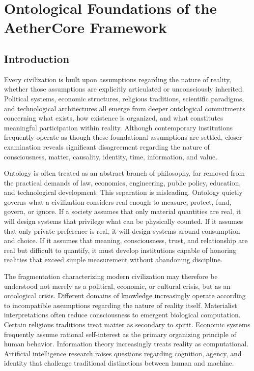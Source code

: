 \documentclass[12pt]{article}
\begin{document}
\section{Ontological Foundations of the AetherCore Framework}

\subsection{Introduction}

Every civilization is built upon assumptions regarding the nature of reality, whether those assumptions are explicitly articulated or unconsciously inherited. Political systems, economic structures, religious traditions, scientific paradigms, and technological architectures all emerge from deeper ontological commitments concerning what exists, how existence is organized, and what constitutes meaningful participation within reality. Although contemporary institutions frequently operate as though these foundational assumptions are settled, closer examination reveals significant disagreement regarding the nature of consciousness, matter, causality, identity, time, information, and value.

Ontology is often treated as an abstract branch of philosophy, far removed from the practical demands of law, economics, engineering, public policy, education, and technological development. This separation is misleading. Ontology quietly governs what a civilization considers real enough to measure, protect, fund, govern, or ignore. If a society assumes that only material quantities are real, it will design systems that privilege what can be physically counted. If it assumes that only private preference is real, it will design systems around consumption and choice. If it assumes that meaning, consciousness, trust, and relationship are real but difficult to quantify, it must develop institutions capable of honoring realities that exceed simple measurement without abandoning discipline.

The fragmentation characterizing modern civilization may therefore be understood not merely as a political, economic, or cultural crisis, but as an ontological crisis. Different domains of knowledge increasingly operate according to incompatible assumptions regarding the nature of reality itself. Materialist interpretations often reduce consciousness to emergent biological computation. Certain religious traditions treat matter as secondary to spirit. Economic systems frequently assume rational self-interest as the primary organizing principle of human behavior. Information theory increasingly treats reality as computational. Artificial intelligence research raises questions regarding cognition, agency, and identity that challenge traditional distinctions between human and machine.
\end{document}
